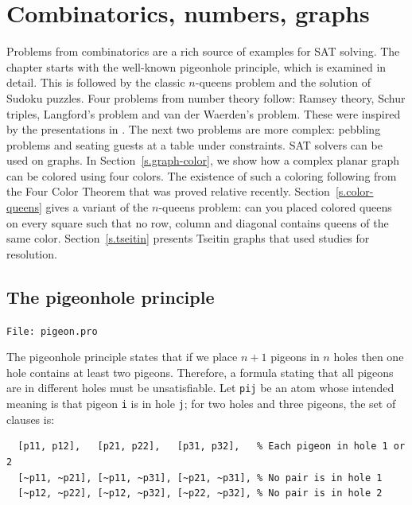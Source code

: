 \documentclass[11pt]{report}
\newcommand*{\p}[1]{\textup{\texttt{#1}}}
\newcommand*{\fl}[1]{\parbox{\textwidth}{\raggedleft \p{File: #1}}}
\begin{document}
\clearpage


\chapter{Combinatorics, numbers, graphs}\label{ch.comb}

Problems from combinatorics are a rich source of examples for SAT solving. The chapter starts with the well-known pigeonhole principle, which is examined in detail. This is followed by the classic $n$-queens problem and the solution of Sudoku puzzles. Four problems from number theory follow: Ramsey theory, Schur triples, Langford's problem and van der Waerden's problem. These were inspired by the presentations in \cite{brute,knuth-sat}. The next two problems are more complex: pebbling problems and seating guests at a table under constraints. SAT solvers can be used on graphs. In Section~\ref{s.graph-color}, we show how a complex planar graph can be colored using four colors. The existence of such a coloring following from the Four Color Theorem that was proved relative recently. Section~\ref{s.color-queens} gives a variant of the $n$-queens problem: can you placed colored queens on every square such that no row, column and diagonal contains queens of the same color. Section~\ref{s.tseitin} presents Tseitin graphs that used studies for resolution.



\section{The pigeonhole principle}\label{ch.pigeon}

\fl{pigeon.pro}

The pigeonhole principle states that if we place $n+1$ pigeons in $n$
holes then one hole contains at least two pigeons. Therefore, a formula
stating that all pigeons are in different holes must be unsatisfiable.
Let \p{pij} be an atom whose intended meaning is that pigeon \p{i} is in
hole \p{j}; for two holes and three pigeons, the set of clauses is:

\begin{verbatim}
  [p11, p12],   [p21, p22],   [p31, p32],   % Each pigeon in hole 1 or 2 
  [~p11, ~p21], [~p11, ~p31], [~p21, ~p31], % No pair is in hole 1
  [~p12, ~p22], [~p12, ~p32], [~p22, ~p32], % No pair is in hole 2
\end{verbatim}
\end{document}
